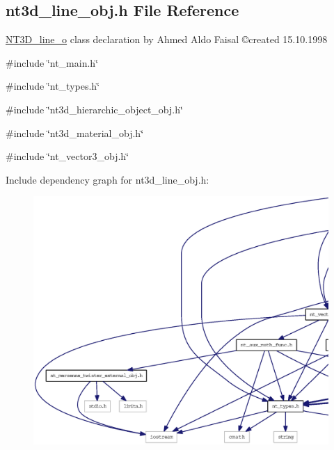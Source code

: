 \subsection{nt3d\_\-line\_\-obj.h File Reference}
\label{nt3d__line__obj_8h}



\begin{DoxyItemize}
\item \hyperlink{class_n_t3_d__line__o}{NT3D\_\-line\_\-o} class declaration by Ahmed Aldo Faisal \copyright created 15.10.1998 
\end{DoxyItemize} 


{\ttfamily \#include \char`\"{}nt\_\-main.h\char`\"{}}\par
{\ttfamily \#include \char`\"{}nt\_\-types.h\char`\"{}}\par
{\ttfamily \#include \char`\"{}nt3d\_\-hierarchic\_\-object\_\-obj.h\char`\"{}}\par
{\ttfamily \#include \char`\"{}nt3d\_\-material\_\-obj.h\char`\"{}}\par
{\ttfamily \#include \char`\"{}nt\_\-vector3\_\-obj.h\char`\"{}}\par
Include dependency graph for nt3d\_\-line\_\-obj.h:
\nopagebreak
\begin{figure}[H]
\begin{center}
\leavevmode
\includegraphics[width=400pt]{nt3d__line__obj_8h__incl}
\end{center}
\end{figure}
